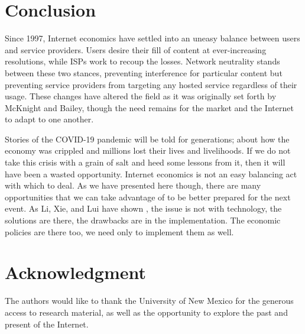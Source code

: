 \documentclass[journal]{IEEEtran}
\begin{document}
\section{Conclusion}
Since 1997, Internet economics have settled into an uneasy balance between users and service providers. Users desire their fill of content at ever-increasing resolutions, while ISPs work to recoup the losses. Network neutrality stands between these two stances, preventing interference for particular content but preventing service providers from targeting any hosted service regardless of their usage. These changes have altered the field as it was originally set forth by McKnight and Bailey, though the need remains for the market and the Internet to adapt to one another.

Stories of the COVID-19 pandemic will be told for generations; about how the economy was crippled and millions lost their lives and livelihoods. If we do not take this crisis with a grain of salt and heed some lessons from it, then it will have been a wasted opportunity. Internet economics is not an easy balancing act with which to deal. As we have presented here though, there are many opportunities that we can take advantage of to be better prepared for the next event. As Li, Xie, and Lui have shown \cite{IEEE_Deployability}, the issue is not with technology, the solutions are there, the drawbacks are in the implementation. The economic policies are there too, we need only to implement them as well.


\section*{Acknowledgment}
The authors would like to thank the University of New Mexico for the generous access to research material, as well as the opportunity to explore the past and present of the Internet.
\end{document}
